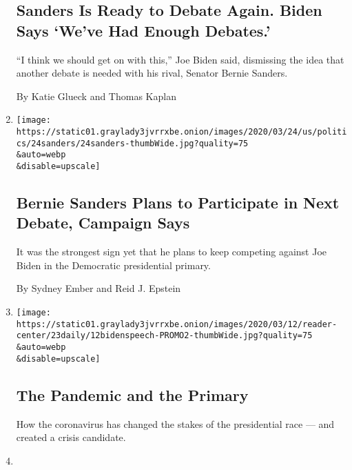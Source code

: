 \begin{enumerate}
  \hypertarget{sanders-is-ready-to-debate-again-biden-says-weve-had-enough-debates}{%
  \subsection{Sanders Is Ready to Debate Again. Biden Says `We've Had
  Enough
  Debates.'}\label{sanders-is-ready-to-debate-again-biden-says-weve-had-enough-debates}}

  ``I think we should get on with this,'' Joe Biden said, dismissing the
  idea that another debate is needed with his rival, Senator Bernie
  Sanders.

  By Katie Glueck and Thomas Kaplan
\item
  \href{/2020/03/24/us/politics/biden-sanders-next-democratic-debate.html}{}

  \texttt{[image: https://static01.graylady3jvrrxbe.onion/images/2020/03/24/us/politics/24sanders/24sanders-thumbWide.jpg?quality=75\\\&auto=webp\\\&disable=upscale]}

  \hypertarget{bernie-sanders-plans-to-participate-in-next-debate-campaign-says}{%
  \subsection{Bernie Sanders Plans to Participate in Next Debate,
  Campaign
  Says}\label{bernie-sanders-plans-to-participate-in-next-debate-campaign-says}}

  It was the strongest sign yet that he plans to keep competing against
  Joe Biden in the Democratic presidential primary.

  By Sydney Ember and Reid J. Epstein
\item
  \href{/2020/03/23/podcasts/the-daily/democratic-primary-coronavirus.html}{}

  \texttt{[image: https://static01.graylady3jvrrxbe.onion/images/2020/03/12/reader-center/23daily/12bidenspeech-PROMO2-thumbWide.jpg?quality=75\\\&auto=webp\\\&disable=upscale]}

  \hypertarget{the-pandemic-and-the-primary}{%
  \subsection{The Pandemic and the
  Primary}\label{the-pandemic-and-the-primary}}

  How the coronavirus has changed the stakes of the presidential race
  --- and created a crisis candidate.
\item
  \href{/2020/03/16/business/media/cnn-debate-ratings-coronavirus.html}{}


\end{enumerate}
